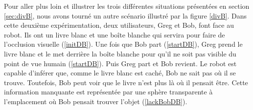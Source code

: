 \documentclass[a4paper,11pt,twoside]{StyleThese}
\begin{document}
Pour aller plus loin et illustrer les trois différentes situations présentées en section \ref{sec:divB}, nous avons tourné un autre scénario illustré par la figure \ref{divB}. Dans cette deuxième expérimentation, deux utilisateurs, Greg et Bob, font face au robot. Ils ont un livre blanc et une boîte blanche qui servira pour faire de l'occlusion visuelle (\ref{initDB}).
Une fois que Bob part (\ref{startDB}), Greg prend le livre blanc et le met derrière la boîte blanche pour qu'il ne soit pas visible du point de vue humain (\ref{startDB}).
Puis Greg part et Bob revient. Le robot est capable d'inférer que, comme le livre blanc est caché, Bob ne sait pas où il se trouve. Toutefois, Bob peut voir que le livre n'est plus là où il pensait être. Cette information manquante est représentée par une sphère transparente à l'emplacement où Bob pensait trouver l'objet (\ref{lackBobDB}).
\end{document}
